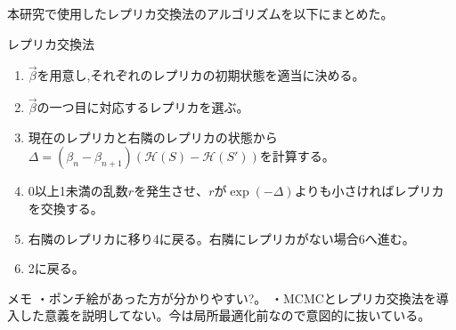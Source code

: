 \documentclass[12pt,titlepage,dvipdfmx]{jarticle}
\begin{document}
本研究で使用したレプリカ交換法のアルゴリズムを以下にまとめた。
\begin{itembox}[2]{レプリカ交換法}
\begin{enumerate}
    \item $\vec{\beta}$を用意し,それぞれのレプリカの初期状態を適当に決める。
    \item $\vec{\beta}$の一つ目に対応するレプリカを選ぶ。
    \item 現在のレプリカと右隣のレプリカの状態から$\Delta = (\beta_n - \beta_{n+1})\left(\mathcal{H}(S) - \mathcal{H}(S')\right)$を計算する。
    \item 0以上1未満の乱数$r$を発生させ、$r$が$\exp(-\Delta)$よりも小さければレプリカを交換する。
    \item 右隣のレプリカに移り4に戻る。右隣にレプリカがない場合6へ進む。
    \item 2に戻る。
\end{enumerate}
\end{itembox}

メモ
・ポンチ絵があった方が分かりやすい?。
・MCMCとレプリカ交換法を導入した意義を説明してない。今は局所最適化前なので意図的に抜いている。
\end{document}
